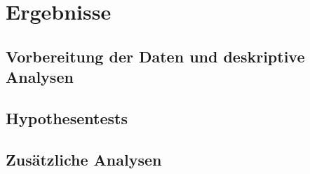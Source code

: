 \section{Ergebnisse}
\subsection{Vorbereitung der Daten und deskriptive Analysen}
\subsection{Hypothesentests}
\subsection{Zusätzliche Analysen}